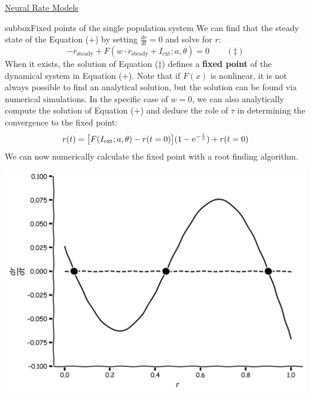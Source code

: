 \begin{textbox}{\href{https://compneuro.neuromatch.io/tutorials/W2D4_DynamicNetworks/chapter_title.html}{Neural Rate Models } }
\begin{subbox}{subbox}{Fixed points of the single population system}
We can find that the steady state of the Equation ($+$) by setting $\displaystyle{\frac{dr}{dt}=0}$ and solve for $r$:
\begin{equation*}
-r_{\text{steady}} + F(w\cdot r_{\text{steady}} + I_{\text{ext}};a,\theta) = 0 \qquad (\ddagger)
\end{equation*}
When it exists, the solution of Equation ($\ddagger$) defines a \textbf{fixed point} of the dynamical system in Equation ($+$). Note that if $F(x)$ is nonlinear, it is not always possible to find an analytical solution, but the solution can be found via numerical simulations.
In the specific case of $w=0$, we can also analytically compute  the solution of Equation ($+$) and deduce the role of $\tau$ in determining the convergence to the fixed point: 
\begin{equation*}
\displaystyle{r(t) = \big{[}F(I_{\text{ext}};a,\theta) -r(t=0)\big{]} (1-\text{e}^{-\frac{t}{\tau}})} + r(t=0)
\end{equation*}
We can now numerically calculate the fixed point with a root finding algorithm.
\begin{center}
\includegraphics[scale=0.1]{Figures/DN/DN_Figure2.png}
\end{center}
\end{subbox}

\end{textbox}
